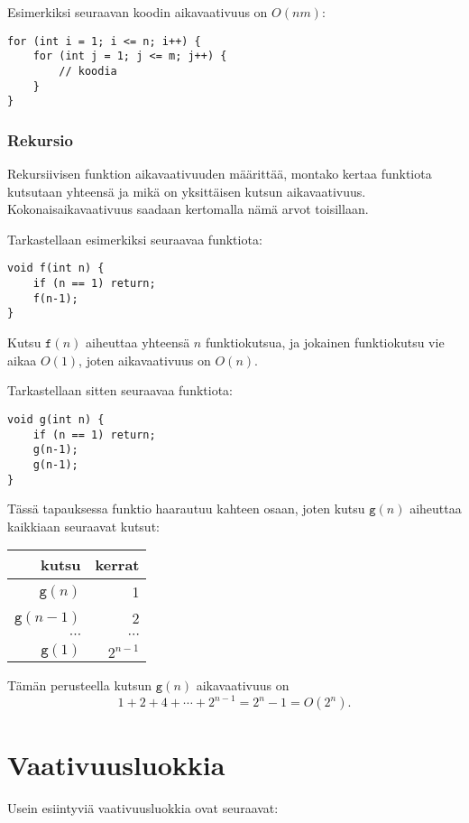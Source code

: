 Esimerkiksi seuraavan koodin
aikavaativuus on $O(nm)$:

\begin{lstlisting}
for (int i = 1; i <= n; i++) {
    for (int j = 1; j <= m; j++) {
        // koodia
    }
}
\end{lstlisting}

\subsubsection*{Rekursio}

Rekursiivisen funktion aikavaativuuden
määrittää, montako kertaa funktiota kutsutaan yhteensä
ja mikä on yksittäisen kutsun aikavaativuus.
Kokonais\-aikavaativuus saadaan kertomalla
nämä arvot toisillaan.

Tarkastellaan esimerkiksi seuraavaa funktiota:
\begin{lstlisting}
void f(int n) {
    if (n == 1) return;
    f(n-1);
}
\end{lstlisting}
Kutsu $\texttt{f}(n)$ aiheuttaa yhteensä $n$ funktiokutsua,
ja jokainen funktiokutsu vie aikaa $O(1)$,
joten aikavaativuus on $O(n)$.

Tarkastellaan sitten seuraavaa funktiota:
\begin{lstlisting}
void g(int n) {
    if (n == 1) return;
    g(n-1);
    g(n-1);
}
\end{lstlisting}
Tässä tapauksessa funktio haarautuu kahteen osaan,
joten kutsu $\texttt{g}(n)$ aiheuttaa kaikkiaan seuraavat kutsut:
\begin{center}
\begin{tabular}{rr}
kutsu & kerrat \\
\hline
$\texttt{g}(n)$ & 1 \\
$\texttt{g}(n-1)$ & 2 \\
$\cdots$ & $\cdots$ \\
$\texttt{g}(1)$ & $2^{n-1}$ \\
\end{tabular}
\end{center}
Tämän perusteella kutsun $\texttt{g}(n)$ aikavaativuus on
\[1+2+4+\cdots+2^{n-1} = 2^n-1 = O(2^n).\]

\section{Vaativuusluokkia}


Usein esiintyviä vaativuusluokkia ovat seuraavat:

